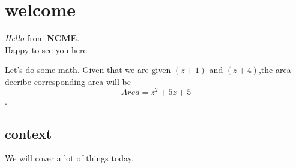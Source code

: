 \documentclass[11pt]{article}
\begin{document}
\section{welcome}
\textit{Hello} \underline{from} \textbf{NCME}. \\
Happy to see you here.

Let's do some math. Given that we are given $(z+1)$ and $(z+4)$,the area decribe corresponding area will be $$Area=z^2+5z+5$$.
 
\subsection[10]{context}
 We will cover a lot of things today.
\end{document}
